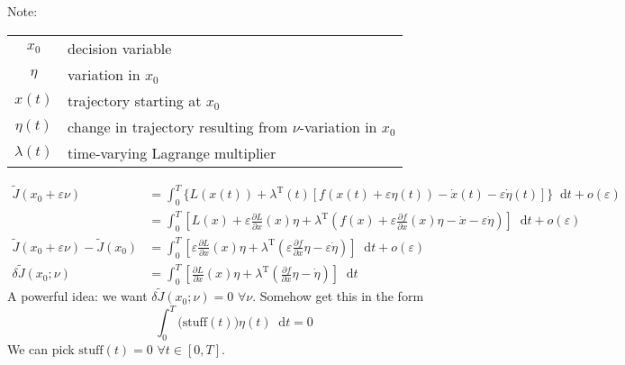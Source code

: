 \documentclass[letterpaper,12pt,titlepage]{report}
\newcommand*\dif{\mathop{}\!\mathrm{d}}
\newcommand{\trans}{^\text{T}}
\newcommand*\pder[2]{\frac{\partial #1}{\partial #2}}
\theoremstyle{plain}
\theoremstyle{definition}
\begin{document}
\begin{center}
\end{center}

Note:

\hspace{\parindent}
\begin{tabular}{cl}
  $x_0$ & decision variable \\
  $\eta$ & variation in $x_0$ \\
  $x(t)$ & trajectory starting at $x_0$ \\
  $\eta(t)$ & change in trajectory resulting from $\nu$-variation in $x_0$ \\
  $\lambda(t)$ & time-varying Lagrange multiplier
\end{tabular}

\begin{align}
  \tilde J(x_0+\varepsilon \nu) &= \int_0^T \Big\{ L(x(t)) + \lambda\trans(t) [f(x(t)+\varepsilon\eta(t)) - \dot x(t) - \varepsilon\dot\eta(t)] \Big\} \dif t + o(\varepsilon) \\
                           &= \int_0^T \left[ L(x) + \varepsilon\pder{L}{x}(x)\eta + \lambda\trans \left( f(x) + \varepsilon\pder{f}{x}(x)\eta - \dot x - \varepsilon\dot\eta \right) \right] \dif t + o(\varepsilon) \\
  \tilde J(x_0+\varepsilon \nu) - \tilde J(x_0) &= \int_0^T \left[ \varepsilon\pder{L}{x}(x)\eta + \lambda\trans\left( \varepsilon\pder{f}{x}\eta - \varepsilon\dot\eta \right) \right] \dif t + o(\varepsilon) \\
  \delta \tilde J (x_0;\nu) &= \int_0^T \left[ \pder{L}{x}(x)\eta + \lambda\trans\left( \pder{f}{x}\eta - \dot\eta \right) \right] \dif t
\end{align}
A powerful idea: we want $\delta\tilde J(x_0;\nu)=0$ $\forall \nu$. Somehow get this in the form
\[ \int_0^T \Big(\text{stuff}(t)\Big) \eta(t) \dif t = 0 \]
We can pick $\text{stuff}(t)=0$ $\forall t\in[0,T]$.
\end{document}

